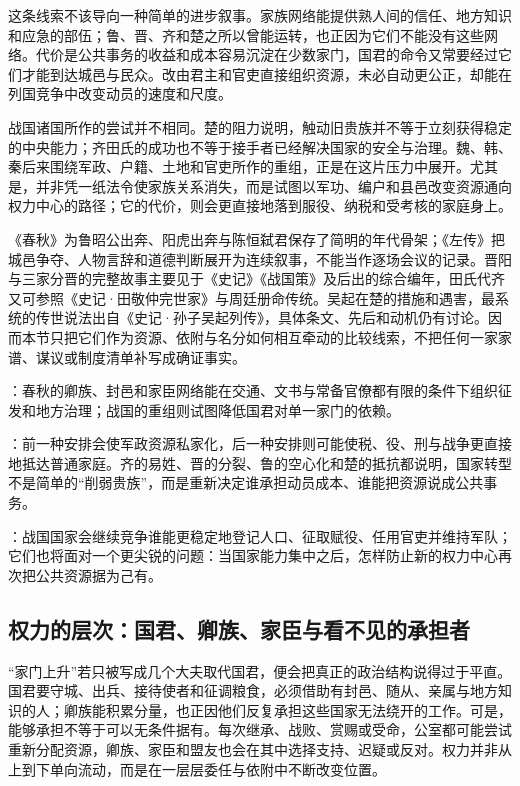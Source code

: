 这条线索不该导向一种简单的进步叙事。家族网络能提供熟人间的信任、地方知识和应急的部伍；鲁、晋、齐和楚之所以曾能运转，也正因为它们不能没有这些网络。代价是公共事务的收益和成本容易沉淀在少数家门，国君的命令又常要经过它们才能到达城邑与民众。改由君主和官吏直接组织资源，未必自动更公正，却能在列国竞争中改变动员的速度和尺度。

战国诸国所作的尝试并不相同。楚的阻力说明，触动旧贵族并不等于立刻获得稳定的中央能力；齐田氏的成功也不等于接手者已经解决国家的安全与治理。魏、韩、秦后来围绕军政、户籍、土地和官吏所作的重组，正是在这片压力中展开。尤其是，并非凭一纸法令使家族关系消失，而是试图以军功、编户和县邑改变资源通向权力中心的路径；它的代价，则会更直接地落到服役、纳税和受考核的家庭身上。

\begin{sourcenote}
《春秋》为鲁昭公出奔、阳虎出奔与陈恒弑君保存了简明的年代骨架；《左传》把城邑争夺、人物言辞和道德判断展开为连续叙事，不能当作逐场会议的记录。晋阳与三家分晋的完整故事主要见于《史记》《战国策》及后出的综合编年，田氏代齐又可参照《史记·田敬仲完世家》与周廷册命传统。吴起在楚的措施和遇害，最系统的传世说法出自《史记·孙子吴起列传》，具体条文、先后和动机仍有讨论。因而本节只把它们作为资源、依附与名分如何相互牵动的比较线索，不把任何一家家谱、谋议或制度清单补写成确证事实。
\end{sourcenote}

\begin{turningpoint}
：春秋的卿族、封邑和家臣网络能在交通、文书与常备官僚都有限的条件下组织征发和地方治理；战国的重组则试图降低国君对单一家门的依赖。

：前一种安排会使军政资源私家化，后一种安排则可能使税、役、刑与战争更直接地抵达普通家庭。齐的易姓、晋的分裂、鲁的空心化和楚的抵抗都说明，国家转型不是简单的“削弱贵族”，而是重新决定谁承担动员成本、谁能把资源说成公共事务。

：战国国家会继续竞争谁能更稳定地登记人口、征取赋役、任用官吏并维持军队；它们也将面对一个更尖锐的问题：当国家能力集中之后，怎样防止新的权力中心再次把公共资源据为己有。
\end{turningpoint}

\subsection{权力的层次：国君、卿族、家臣与看不见的承担者}

“家门上升”若只被写成几个大夫取代国君，便会把真正的政治结构说得过于平直。国君要守城、出兵、接待使者和征调粮食，必须借助有封邑、随从、亲属与地方知识的人；卿族能积累分量，也正因他们反复承担这些国家无法绕开的工作。可是，能够承担不等于可以无条件据有。每次继承、战败、赏赐或受命，公室都可能尝试重新分配资源，卿族、家臣和盟友也会在其中选择支持、迟疑或反对。权力并非从上到下单向流动，而是在一层层委任与依附中不断改变位置。

